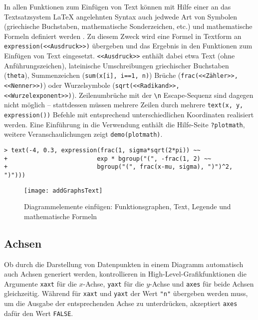 In allen Funktionen zum Einfügen von Text können mit Hilfe einer an das Textsatzsystem \LaTeX{} angelehnten Syntax auch jedwede Art von Symbolen (griechische Buchstaben, mathematische Sonderzeichen, etc.) und mathematische Formeln definiert werden \cite{Ligges2002}. Zu diesem Zweck wird eine Formel in Textform an \lstinline!expression(<<Ausdruck>>)! übergeben und das Ergebnis in den Funktionen zum Einfügen von Text eingesetzt. \lstinline!<<Ausdruck>>! enthält dabei etwa Text (ohne Anführungszeichen), lateinische Umschreibungen griechischer Buchstaben (\lstinline!theta!), Summenzeichen (\lstinline!sum(x[i], i==1, n)!) Brüche (\lstinline!frac(<<Zähler>>, <<Nenner>>)!) oder Wurzelsymbole (\lstinline!sqrt(<<Radikand>>, <<Wurzelexponent>>)!). Zeilenumbrüche mit der \lstinline!\n! Escape-Sequenz sind dagegen nicht möglich -- stattdessen müssen mehrere Zeilen durch mehrere \lstinline!text(x, y, expression())! Befehle mit entsprechend unterschiedlichen Koordinaten realisiert werden. Eine Einführung in die Verwendung enthält die Hilfe-Seite \lstinline!?plotmath!, weitere Veranschaulichungen zeigt \lstinline!demo(plotmath)!.
\begin{lstlisting}
> text(-4, 0.3, expression(frac(1, sigma*sqrt(2*pi)) ~~
+                         exp * bgroup("(", -frac(1, 2) ~~
+                         bgroup("(", frac(x-mu, sigma), ")")^2, ")")))
\end{lstlisting}

\begin{figure}[ht]
\centering
\texttt{[image: addGraphsText]}
\vspace*{-0.5em}
\caption{Diagrammelemente einfügen: Funktionsgraphen, Text, Legende und mathematische Formeln}
\label{fig:addGraphsText}
\end{figure}

\subsection{Achsen}
\label{sec:axis}

Ob durch die Darstellung von Datenpunkten in einem Diagramm automatisch auch Achsen generiert werden, kontrollieren in High-Level-Grafikfunktionen die Argumente \lstinline!xaxt! für die $x$-Achse, \lstinline!yaxt! für die $y$-Achse und \lstinline!axes! für beide Achsen gleichzeitig. Während für \lstinline!xaxt! und \lstinline!yaxt! der Wert \lstinline!"n"! übergeben werden muss, um die Ausgabe der entsprechenden Achse zu unterdrücken, akzeptiert \lstinline!axes! dafür den Wert \lstinline!FALSE!\@.

